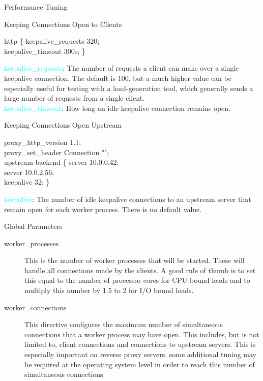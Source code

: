 \documentclass{beamer}
\begin{document}
\begin{frame}{Performance Tuning}
\begin{block}{Keeping Connections Open to Clients}
	\vspace{0.01\textheight}
	\scriptsize
	\begin{Alms*}
		http \{ \NI
		keepalive\_requests 320; \\
		keepalive\_timeout 300s;
		\ND \}
	\end{Alms*}
\textcolor{cyan}{keepalive\_requests}: The number of requests a client can make over a single keepalive connection. The default is 100, but a much higher value can be especially useful for testing with a load‑generation tool, which generally sends a large number of requests from a single client. \\
\textcolor{cyan}{keepalive\_timeout}: How long an idle keepalive connection remains open.
\end{block}


\begin{block}{Keeping Connections Open Upstream}
	\vspace{0.01\textheight}
	\scriptsize
	\begin{Alms*}
		proxy\_http\_version 1.1; \\
		proxy\_set\_header Connection ""; \\
		upstream backend \{ \NI
			server 10.0.0.42; \\
			server 10.0.2.56; \\
			keepalive 32;
		\ND \}
	\end{Alms*}

\textcolor{cyan}{keepalive}: The number of idle keepalive connections to an upstream server that remain open for each worker process. There is no default value.
\end{block}
\end{frame}


\begin{frame}{Global Parameters}

\begin{description}
	\item[worker\_processes] This is the number of worker processes
	that will be started. These will handle all connections made by the clients. A good rule of thumb is to set this equal to the number of processor cores for CPU-bound loads and to multiply this number by 1.5 to 2 for I/O bound loads\cite{aivaliotis2016mastering}.
	\item[worker\_connections] This directive configures the maximum number of simultaneous connections
	that a worker process may have open. This includes, but is not limited to, client connections and connections to upstream servers. This is especially important on reverse proxy servers. some additional tuning may be required at the operating system level in order to reach this number of simultaneous connections.
\end{description}

\end{frame}
\end{document}
